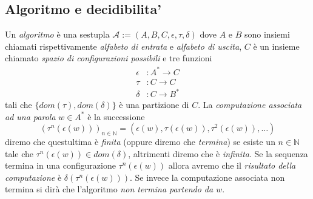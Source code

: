 \subsection{Algoritmo e decidibilita'}
\begin{defi}[Algoritmo]
    Un \textit{algoritmo} è una sestupla $\mathcal A:=(A,B,C,\epsilon, \tau, \delta)$ dove
    $A$ e $B$ sono insiemi chiamati rispettivamente \textit{alfabeto di entrata} e \textit{alfabeto di uscita}, $C$ è un insieme chiamato \textit{spazio di configurazioni possibili} e tre funzioni
\begin{align*} \epsilon &: A^* \to C \\ \tau &: C \to C \\ \delta &: C \to B^* \end{align*}
tali che 
$\{dom(\tau), dom(\delta)\}$
è una partizione di $C$.
La \textit{computazione associata ad una parola} $w \in A^*$
è la successione
\[
(\tau^n(\epsilon(w)))_{n \in \mathbb N}
=
(\epsilon(w), \tau(\epsilon(w)), \tau^2(\epsilon(w)), \dots)
\]
diremo che questultima è \textit{finita} (oppure diremo che \textit{termina}) se esiste un $n \in \mathbb N$ tale che $\tau ^n(\epsilon(w))\in dom(\delta)$, altrimenti diremo che è \textit{infinita}.
Se la  sequenza termina in una configurazione $\tau^n(\epsilon(w))$ allora avremo che il \textit{risultato della computazione} è $\delta(\tau^n(\epsilon(w)))$.
Se invece la computazione associata non termina si dirà che l'algoritmo \textit{non termina partendo da $w$}.
\end{defi}
